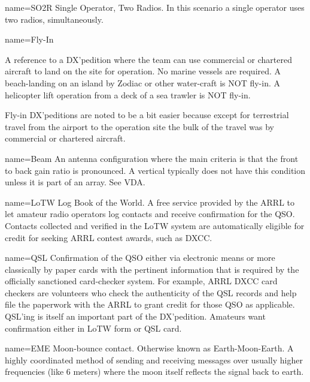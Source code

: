  { name={{SO2R}} }
{
Single Operator, Two Radios.  In this scenario a single operator
uses two radios, simultaneously.
}

 { name={{Fly-In}} }
{
A reference to a DX'pedition where the team can use commercial
or chartered aircraft to land on the site for operation.  No marine
vessels are required.  A beach-landing on an island by Zodiac or other
water-craft is NOT fly-in.   A helicopter lift operation from a deck
of a sea trawler is NOT fly-in.   
\par
Fly-in DX'peditions are noted to be a bit easier because except for
terrestrial travel from the airport to the operation site the bulk of the
travel was by commercial or chartered aircraft.
}

 { name={{Beam}} }
{ 
An antenna configuration where the main criteria is that the front to back
gain ratio is pronounced.  A vertical typically does not have this 
condition unless it is part of an array.  See VDA.
}

 { name={{LoTW}} }
{
Log Book of the World.  A free service provided by the ARRL
to let amateur radio operators log contacts and receive
confirmation for the QSO.  Contacts collected and verified
in the LoTW system are automatically eligible for credit
for seeking ARRL contest awards, such as DXCC.
}

 { name={{QSL}} }
{
Confirmation of the QSO either via electronic means
or more classically by paper cards with the pertinent
information that is required by the officially sanctioned
card-checker system.  For example, ARRL DXCC card checkers
are volunteers who check the authenticity of the QSL records
and help file the paperwork with the ARRL to grant credit
for those QSO as applicable.  QSL'ing is itself an important
part of the DX'pedition.  Amateurs want confirmation either
in LoTW form or QSL card.}

 { name={{EME}} }
{
Moon-bounce contact.  Otherwise known as Earth-Moon-Earth.  A
highly coordinated method of sending and receiving messages
over usually higher frequencies (like 6 meters) where the moon
itself reflects the signal back to earth.
}

